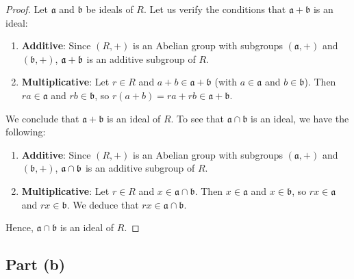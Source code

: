 \documentclass[11pt]{article}
\begin{document}
\begin{proof}
  Let $\mathfrak{a}$ and $\mathfrak{b}$ be ideals of $R$. Let us verify the conditions that $\mathfrak{a} + \mathfrak{b}$ is an ideal:
  \begin{enumerate}
    \item \textbf{Additive}: Since $(R, +)$ is an Abelian group with subgroups $(\mathfrak{a}, +)$ and $(\mathfrak{b}, +)$, $\\ \mathfrak{a} + \mathfrak{b}$ is an additive subgroup of $R$.
    \item \textbf{Multiplicative}: Let $r \in R$ and $a + b \in \mathfrak{a} + \mathfrak{b}$ (with $a \in \mathfrak{a}$ and $b \in \mathfrak{b}$). Then $ra \in \mathfrak{a}$ and $rb \in \mathfrak{b}$, so $r(a + b) = ra + rb \in \mathfrak{a + \mathfrak{b}}$.
  \end{enumerate}
  We conclude that $\mathfrak{a} + \mathfrak{b}$ is an ideal of $R$. To see that $\mathfrak{a} \cap \mathfrak{b}$ is an ideal, we have the following:
  \begin{enumerate}
    \item \textbf{Additive}: Since $(R, +)$ is an Abelian group with subgroups $(\mathfrak{a}, +)$ and $(\mathfrak{b}, +)$, $\\ \mathfrak{a} \cap \mathfrak{b}$ is an additive subgroup of $R$.
    \item \textbf{Multiplicative}: Let $r \in R$ and $x \in \mathfrak{a} \cap \mathfrak{b}$. Then $x \in \mathfrak{a}$ and $x \in \mathfrak{b}$, so $rx \in \mathfrak{a}$ and $rx \in \mathfrak{b}$. We deduce that $rx \in \mathfrak{a} \cap \mathfrak{b}$.
  \end{enumerate}
  Hence, $\mathfrak{a} \cap \mathfrak{b}$ is an ideal of $R$.
\end{proof}


\subsection*{Part (b)}
\end{document}
